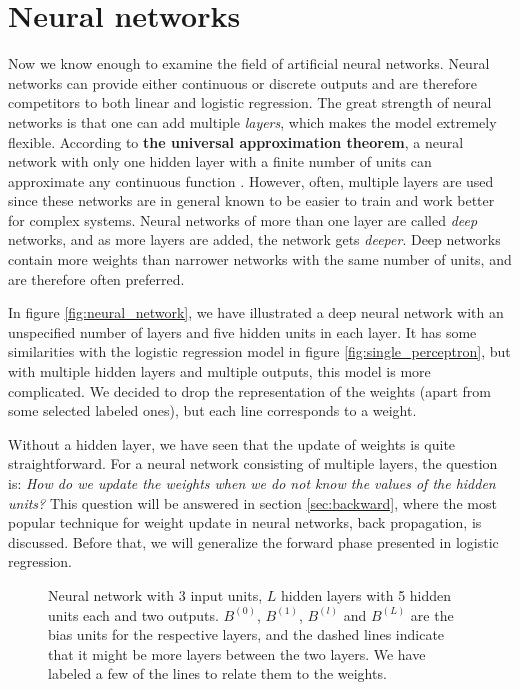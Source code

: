 \section{Neural networks} \label{sec:neural_network}
Now we know enough to examine the field of artificial neural networks. Neural networks can provide either continuous or discrete outputs and are therefore competitors to both linear and logistic regression. The great strength of neural networks is that one can add multiple \textit{layers}, which makes the model extremely flexible. According to \textbf{the universal approximation theorem}, a neural network with only one hidden layer with a finite number of units can approximate any continuous function \supercite{hornik_multilayer_1989}. However, often, multiple layers are used since these networks are in general known to be easier to train and work better for complex systems. Neural networks of more than one layer are called \textit{deep} networks, and as more layers are added, the network gets \textit{deeper}. Deep networks contain more weights than narrower networks with the same number of units, and are therefore often preferred.

In figure \eqref{fig:neural_network}, we have illustrated a deep neural network with an unspecified number of layers and five hidden units in each layer. It has some similarities with the logistic regression model in figure \eqref{fig:single_perceptron}, but with multiple hidden layers and multiple outputs, this model is more complicated. We decided to drop the representation of the weights (apart from some selected labeled ones), but each line corresponds to a weight.

Without a hidden layer, we have seen that the update of weights is quite straightforward. For a neural network consisting of multiple layers, the question is: \textit{How do we update the weights when we do not know the values of the hidden units?} This question will be answered in section \ref{sec:backward}, where the most popular technique for weight update in neural networks, back propagation, is discussed. Before that, we will generalize the forward phase presented in logistic regression.

\begin{figure}
	\centering
	
	\caption{Neural network with 3 input units, $L$ hidden layers with 5 hidden units each and two outputs. $B^{(0)}$, $B^{(1)}$, $B^{(l)}$ and $B^{(L)}$ are the bias units for the respective layers, and the dashed lines indicate that it might be more layers between the two layers. We have labeled a few of the lines to relate them to the weights.}
	\label{fig:neural_network}
\end{figure}

